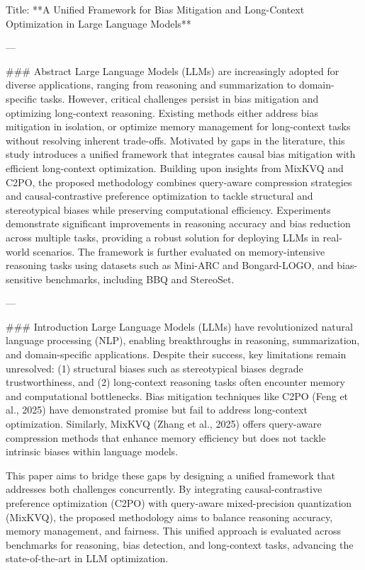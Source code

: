 Title: **A Unified Framework for Bias Mitigation and Long-Context Optimization in Large Language Models**

---

### Abstract
Large Language Models (LLMs) are increasingly adopted for diverse applications, ranging from reasoning and summarization to domain-specific tasks. However, critical challenges persist in bias mitigation and optimizing long-context reasoning. Existing methods either address bias mitigation in isolation, or optimize memory management for long-context tasks without resolving inherent trade-offs. Motivated by gaps in the literature, this study introduces a unified framework that integrates causal bias mitigation with efficient long-context optimization. Building upon insights from MixKVQ and C2PO, the proposed methodology combines query-aware compression strategies and causal-contrastive preference optimization to tackle structural and stereotypical biases while preserving computational efficiency. Experiments demonstrate significant improvements in reasoning accuracy and bias reduction across multiple tasks, providing a robust solution for deploying LLMs in real-world scenarios. The framework is further evaluated on memory-intensive reasoning tasks using datasets such as Mini-ARC and Bongard-LOGO, and bias-sensitive benchmarks, including BBQ and StereoSet.

---

### Introduction
Large Language Models (LLMs) have revolutionized natural language processing (NLP), enabling breakthroughs in reasoning, summarization, and domain-specific applications. Despite their success, key limitations remain unresolved: (1) structural biases such as stereotypical biases degrade trustworthiness, and (2) long-context reasoning tasks often encounter memory and computational bottlenecks. Bias mitigation techniques like C2PO (Feng et al., 2025) have demonstrated promise but fail to address long-context optimization. Similarly, MixKVQ (Zhang et al., 2025) offers query-aware compression methods that enhance memory efficiency but does not tackle intrinsic biases within language models.

This paper aims to bridge these gaps by designing a unified framework that addresses both challenges concurrently. By integrating causal-contrastive preference optimization (C2PO) with query-aware mixed-precision quantization (MixKVQ), the proposed methodology aims to balance reasoning accuracy, memory management, and fairness. This unified approach is evaluated across benchmarks for reasoning, bias detection, and long-context tasks, advancing the state-of-the-art in LLM optimization.

